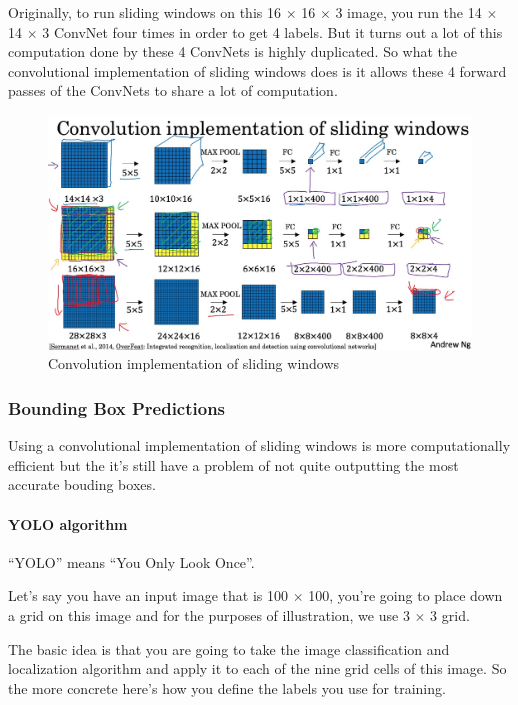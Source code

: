 \documentclass[UTF8]{article}
\begin{document}
Originally, to run sliding windows on this 16 $\times$ 16 $\times$ 3 image, you run the 14 $\times$
14 $\times$ 3 ConvNet four times in order to get 4 labels. But it turns out a lot of this
computation done by these 4 ConvNets is highly duplicated. So what the convolutional implementation
of sliding windows does is it allows these 4 forward passes of the ConvNets to share a lot of
computation.

\begin{figure}[htb]
    \centering
    \includegraphics[width=40em]{figures/conv-implementation-of-sliding-windows}
    \caption{Convolution implementation of sliding windows}
    \label{fig:conv-implementation-of-sliding-windows}
\end{figure}

\subsubsection{Bounding Box Predictions}
Using a convolutional implementation of sliding windows is more computationally efficient but the
it's still have a problem of not quite outputting the most accurate bouding boxes.

\paragraph{YOLO algorithm}
``YOLO'' means ``You Only Look Once''.

Let's say you have an input image that is 100 $\times$ 100, you're going to place down a grid on
this image and for the purposes of illustration, we use 3 $\times$ 3 grid.

The basic idea is that you are going to take the image classification and localization algorithm
and apply it to each of the nine grid cells of this image. So the more concrete here's how you
define the labels you use for training.
\end{document}
